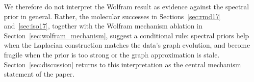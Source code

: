 We therefore do not interpret the Wolfram result as evidence against the spectral prior in general. Rather, the molecular successes in Sections~\ref{sec:rmd17} and~\ref{sec:iso17}, together with the Wolfram mechanism ablation in Section~\ref{sec:wolfram_mechanism}, suggest a conditional rule: spectral priors help when the Laplacian construction matches the data's graph evolution, and become fragile when the prior is too strong or the graph approximation is stale. Section~\ref{sec:discussion} returns to this interpretation as the central mechanism statement of the paper.
